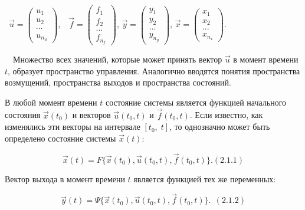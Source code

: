 		\  $\vec u=\left(\begin{matrix}u_1\\u_2\\\cdots \\u_{n_u}\end{matrix}\right)$,\ \  $\vec
		f=\left(\begin{matrix}f_1\\f_2\\...\\f_{n_f}\end{matrix}\right)$,   $\vec
		y=\left(\begin{matrix}y_1\\y_2\\...\\y_{n_y}\end{matrix}\right)$,   $\vec
		x=\left(\begin{matrix}x_1\\x_2\\...\\x_{n_x}\end{matrix}\right)$.



\bigskip


		\ \ Множество всех значений, которые может принять вектор  $\vec u$ в момент времени  $t$, образует пространство
		управления. Аналогично вводятся понятия пространства возмущений, пространства выходов и пространства состояний.



		В любой момент времени  $t$ состояние системы является функцией начального состояния  $\vec x(t_0)$ и векторов  $\vec
		u(t_0,t)$ и  $\vec f(t_0,t)$. Если известно, как изменялись эти векторы на интервале  $[t_0,\;t]$, то однозначно может
		быть определено состояние системы  $\vec x(t)$:



\begin{equation}\label{eq:equation_of_state}
		 \vec x(t)=F\{\vec x(t_0),\vec u(t_0,t),\vec f(t_0,t)\}. (2.1.1)
\end{equation}



		Вектор выхода в момент времени  $t$ является функцией тех же переменных:



\begin{equation}\label{eq:output equation}
		\vec y(t)=\Psi\{\vec x(t_0),\overrightarrow u(t_0,t),\vec f(t_0,t)\}.\ \ (2.1.2)
\end{equation}



